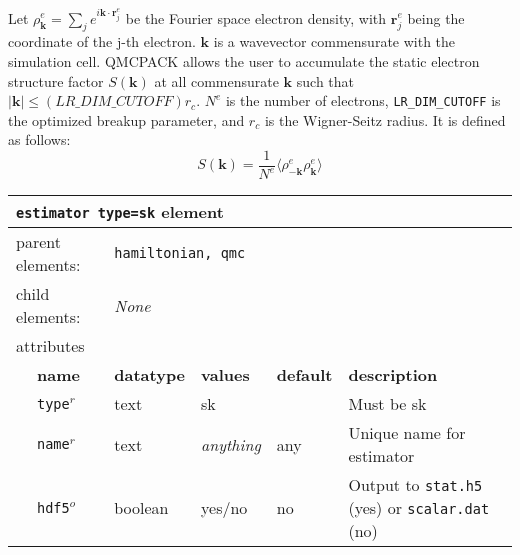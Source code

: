 Let $\rho^e_{\mathbf{k}}=\sum_j e^{i \mathbf{k}\cdot\mathbf{r}_j^e}$ be the Fourier space electron density, with $\mathbf{r}^e_j$ being the coordinate of the j-th electron.  $\mathbf{k}$ is a wavevector commensurate with the simulation cell.  QMCPACK allows the user to accumulate the static electron structure factor $S(\mathbf{k})$ at all commensurate $\mathbf{k}$ such that $|\mathbf{k}| \leq (LR\_DIM\_CUTOFF) r_c$.  $N^e$ is the number of electrons, \texttt{LR\_DIM\_CUTOFF} is the optimized breakup parameter, and $r_c$ is the Wigner-Seitz radius.  It is defined as follows:
\begin{equation}
S(\mathbf{k}) = \frac{1}{N^e}\langle \rho^e_{-\mathbf{k}} \rho^e_{\mathbf{k}} \rangle
\end{equation}


\FloatBarrier
\begin{table}[h]
\begin{center}
\begin{tabularx}{\textwidth}{l l l l l l }
\hline
\multicolumn{6}{l}{\texttt{estimator type=sk} element} \\
\hline
\multicolumn{2}{l}{parent elements:} & \multicolumn{4}{l}{\texttt{hamiltonian, qmc}}\\
\multicolumn{2}{l}{child  elements:} & \multicolumn{4}{l}{\textit{None}}\\
\multicolumn{2}{l}{attributes}  & \multicolumn{4}{l}{}\\
   & \bfseries name       & \bfseries datatype & \bfseries values  & \bfseries default   & \bfseries description \\
   & \texttt{type}$^r$    &  text              & sk      &                     & Must be sk       \\
   & \texttt{name}$^r$    &  text              & \textit{anything} & any                 & Unique name for estimator \\
   & \texttt{hdf5}$^o$    &  boolean           & yes/no            & no                  & Output to \texttt{stat.h5} (yes) or \texttt{scalar.dat} (no) \\
  \hline
\end{tabularx}
\end{center}
\end{table}
\FloatBarrier

